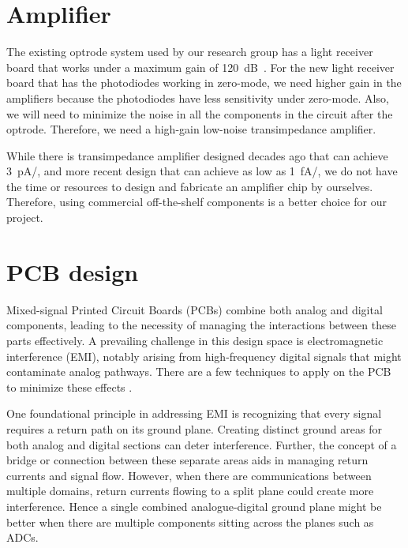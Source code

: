 \section{Amplifier}

The existing optrode system used by our research group has a light receiver board that works under a maximum gain of \qty{120}{dB\Omega}.  For the new light receiver board that has the photodiodes working in zero-mode, we need higher gain in the amplifiers because the photodiodes have less sensitivity under zero-mode.  Also, we will need to minimize the noise in all the components in the circuit after the optrode.  Therefore, we need a high-gain low-noise transimpedance amplifier.

While there is transimpedance amplifier \cite{TIA_1} designed decades ago that can achieve \qty{3}{pA/}, and more recent design \cite{TIA_2} \cite{TIA_3} that can achieve as low as \qty{1}{fA/}, we do not have the time or resources to design and fabricate an amplifier chip by ourselves.  Therefore, using commercial off-the-shelf components \cite{COTSTIA}\cite{OpenSouceTIA} is a better choice for our project.

\section{PCB design}

Mixed-signal Printed Circuit Boards (PCBs) combine both analog and digital components, leading to the necessity of managing the interactions between these parts effectively. A prevailing challenge in this design space is electromagnetic interference (EMI), notably arising from high-frequency digital signals that might contaminate analog pathways.  There are a few techniques to apply on the PCB to minimize these effects \cite{MixPCB} \cite{MixPCB_2} \cite{MixPCB_3} \cite{CirDesCom}.

One foundational principle in addressing EMI is recognizing that every signal requires a return path on its ground plane. Creating distinct ground areas for both analog and digital sections can deter interference. Further, the concept of a bridge or connection between these separate areas aids in managing return currents and signal flow. However, when there are communications between multiple domains, return currents flowing to a split plane could create more interference.  Hence a single combined analogue-digital ground plane might be better when there are multiple components sitting across the planes such as ADCs.

